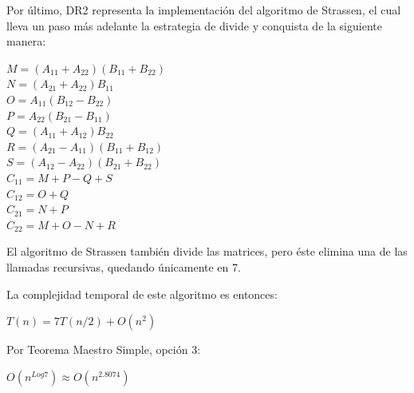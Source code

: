 \documentclass[12pt]{report}
\begin{document}
  Por último, DR2 representa la implementación del algoritmo de Strassen, el cual lleva un paso más adelante la estrategia de divide y conquista de la siguiente manera:
  
  \begin{center}
    $ M = (A_{11} + A_{22})(B_{11} + B_{22}) $ \\
    $ N = (A_{21} + A_{22})B_{11} $ \\
    $ O = A_{11}(B_{12} - B_{22}) $ \\
    $ P = A_{22}(B_{21} - B_{11}) $ \\
    $ Q = (A_{11} + A_{12})B_{22} $ \\
    $ R = (A_{21} - A_{11})(B_{11} + B_{12}) $\\
    $ S = (A_{12} - A_{22})(B_{21} + B_{22}) $ \\
    $ C_{11} = M + P - Q + S $ \\
    $ C_{12} = O + Q $ \\
    $ C_{21} = N + P $ \\
    $ C_{22} = M + O - N + R $
  \end{center}
  
  El algoritmo de Strassen también divide las matrices, pero éste elimina una de las llamadas recursivas, quedando únicamente en 7.
  
  La complejidad temporal de este algoritmo es entonces:
  
  \begin{center}
      $ T(n) = 7T(n/2) +  O(n^2) $
  \end{center}

  
  Por Teorema Maestro Simple, opción 3:
  
  \begin{center}
    $ O(n^{Log7}) \approx O(n^{2.8074}) $
  \end{center}
  
  \centering
\end{document}
